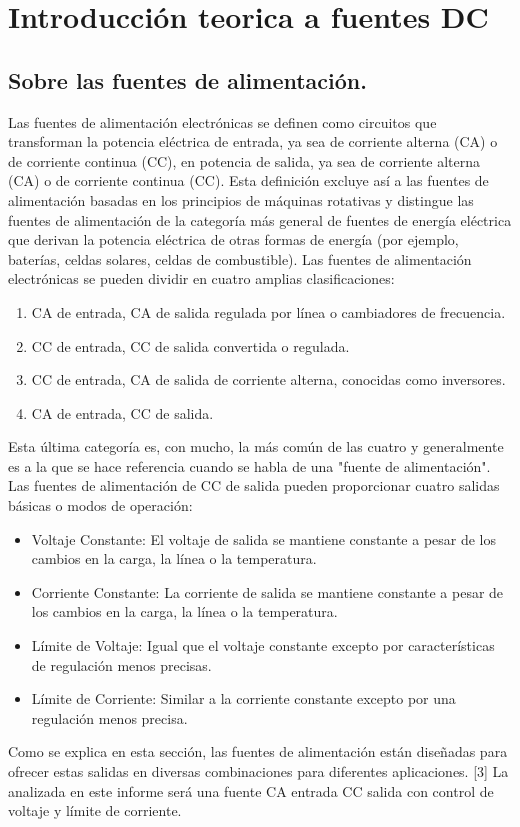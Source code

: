 \chapter{Introducción teorica a fuentes DC}

\label{C:Fuentes de corriente continua}

\section{Sobre las fuentes de alimentación.}
Las fuentes de alimentación electrónicas se definen como circuitos que transforman la potencia eléctrica de entrada, ya sea de corriente alterna (CA) o de corriente continua (CC), en potencia de salida, ya sea de corriente alterna (CA) o de corriente continua (CC). Esta definición excluye así a las fuentes de alimentación basadas en los principios de máquinas rotativas y distingue las fuentes de alimentación de la categoría más general de fuentes de energía eléctrica que derivan la potencia eléctrica de otras formas de energía (por ejemplo, baterías, celdas solares, celdas de combustible). Las fuentes de alimentación electrónicas se pueden dividir en cuatro amplias clasificaciones:

\begin{enumerate}
    \item CA de entrada, CA de salida regulada por línea o cambiadores de frecuencia.
    \item CC de entrada, CC de salida convertida o regulada.
    \item CC de entrada, CA de salida de corriente alterna, conocidas como inversores.
    \item CA de entrada, CC de salida.
\end{enumerate}

Esta última categoría es, con mucho, la más común de las cuatro y generalmente es a la que se hace referencia cuando se habla de una "fuente de alimentación". Las fuentes de alimentación de CC de salida pueden proporcionar cuatro salidas básicas o modos de operación:

\begin{itemize}
    \item Voltaje Constante: El voltaje de salida se mantiene constante a pesar de los cambios en la carga, la línea o la temperatura.
    \item Corriente Constante: La corriente de salida se mantiene constante a pesar de los cambios en la carga, la línea o la temperatura.
    \item Límite de Voltaje: Igual que el voltaje constante excepto por características de regulación menos precisas.
    \item Límite de Corriente: Similar a la corriente constante excepto por una regulación menos precisa.
\end{itemize}
Como se explica en esta sección, las fuentes de alimentación están diseñadas para ofrecer estas salidas en diversas combinaciones para diferentes aplicaciones. [3]
La analizada en este informe será una fuente CA entrada CC salida con control de voltaje y límite de corriente.


